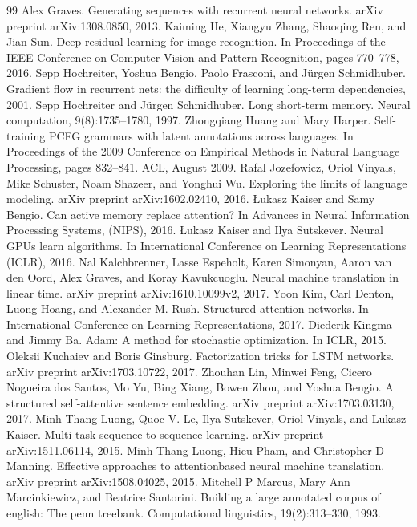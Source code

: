 \documentclass[conference]{IEEEtran}
\begin{document}
\begin{thebibliography}{99}
 Alex Graves. Generating sequences with recurrent neural networks. arXiv preprint arXiv:1308.0850, 2013.
 Kaiming He, Xiangyu Zhang, Shaoqing Ren, and Jian Sun. Deep residual learning for image recognition. In Proceedings of the IEEE Conference on Computer Vision and Pattern Recognition, pages 770--778, 2016.
 Sepp Hochreiter, Yoshua Bengio, Paolo Frasconi, and Jürgen Schmidhuber. Gradient flow in recurrent nets: the difficulty of learning long-term dependencies, 2001.
 Sepp Hochreiter and Jürgen Schmidhuber. Long short-term memory. Neural computation, 9(8):1735--1780, 1997.
 Zhongqiang Huang and Mary Harper. Self-training PCFG grammars with latent annotations across languages. In Proceedings of the 2009 Conference on Empirical Methods in Natural Language Processing, pages 832--841. ACL, August 2009.
 Rafal Jozefowicz, Oriol Vinyals, Mike Schuster, Noam Shazeer, and Yonghui Wu. Exploring the limits of language modeling. arXiv preprint arXiv:1602.02410, 2016.
 Łukasz Kaiser and Samy Bengio. Can active memory replace attention? In Advances in Neural Information Processing Systems, (NIPS), 2016.
 Łukasz Kaiser and Ilya Sutskever. Neural GPUs learn algorithms. In International Conference on Learning Representations (ICLR), 2016.
 Nal Kalchbrenner, Lasse Espeholt, Karen Simonyan, Aaron van den Oord, Alex Graves, and Koray Kavukcuoglu. Neural machine translation in linear time. arXiv preprint arXiv:1610.10099v2, 2017.
 Yoon Kim, Carl Denton, Luong Hoang, and Alexander M. Rush. Structured attention networks. In International Conference on Learning Representations, 2017.
 Diederik Kingma and Jimmy Ba. Adam: A method for stochastic optimization. In ICLR, 2015.
 Oleksii Kuchaiev and Boris Ginsburg. Factorization tricks for LSTM networks. arXiv preprint arXiv:1703.10722, 2017.
 Zhouhan Lin, Minwei Feng, Cicero Nogueira dos Santos, Mo Yu, Bing Xiang, Bowen Zhou, and Yoshua Bengio. A structured self-attentive sentence embedding. arXiv preprint arXiv:1703.03130, 2017.
 Minh-Thang Luong, Quoc V. Le, Ilya Sutskever, Oriol Vinyals, and Lukasz Kaiser. Multi-task sequence to sequence learning. arXiv preprint arXiv:1511.06114, 2015.
 Minh-Thang Luong, Hieu Pham, and Christopher D Manning. Effective approaches to attentionbased neural machine translation. arXiv preprint arXiv:1508.04025, 2015.
 Mitchell P Marcus, Mary Ann Marcinkiewicz, and Beatrice Santorini. Building a large annotated corpus of english: The penn treebank. Computational linguistics, 19(2):313--330, 1993.

\end{thebibliography}
\end{document}
